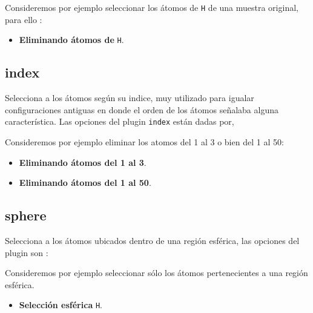Consideremos por ejemplo seleccionar los \'atomos de \verb|H| de una muestra
original, para ello :

\begin{itemize}
 \item \textbf{Eliminando \'atomos de} \texttt{H}.
\end{itemize}


\subsection{index}
Selecciona a los \'atomos seg\'un su indice, muy utilizado para igualar
configuraciones antiguas en donde el orden de los \'atomos se\~nalaba alguna
caracter\'istica. Las opciones del plugin \verb|index| est\'an dadas por,


Consideremos por ejemplo eliminar los atomos del 1 al 3 o bien del 1 al 50:

\begin{itemize}
 \item \textbf{Eliminando \'atomos del 1 al 3}.
 \item \textbf{Eliminando \'atomos del 1 al 50}.
\end{itemize}

\subsection{sphere}
Selecciona a los \'atomos ubicados dentro de una regi\'on esf\'erica, las
opciones del plugin son :


Consideremos por ejemplo seleccionar s\'olo los \'atomos pertenecientes a una
regi\'on esf\'erica.

\begin{itemize}
 \item \textbf{Selecci\'on esf\'erica} \texttt{H}.
\end{itemize}

